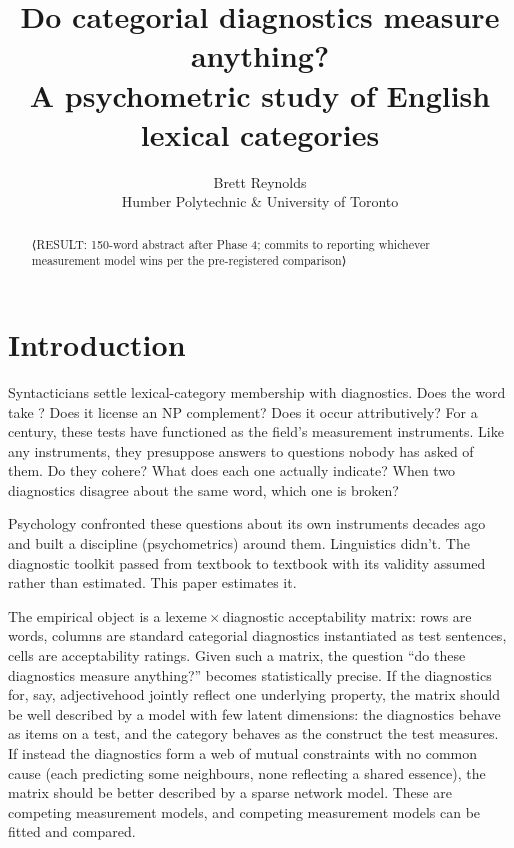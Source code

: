 \documentclass[12pt]{article}
\title{Do categorial diagnostics measure anything?\\
\large A psychometric study of English lexical categories}
\author{Brett Reynolds\\Humber Polytechnic \& University of Toronto}
\date{}
\begin{document}
\maketitle

\begin{abstract}
\noindent ⟨RESULT: 150-word abstract after Phase 4; commits to reporting
whichever measurement model wins per the pre-registered comparison⟩
\end{abstract}

\section{Introduction}\label{sec:intro}

Syntacticians settle lexical-category membership with diagnostics. Does the word
take ? Does it license an NP complement? Does it occur
attributively? For a century, these tests have functioned as the field's
measurement instruments. Like any instruments, they presuppose
answers to questions nobody has asked of them. Do they cohere? What does
each one actually indicate? When two diagnostics disagree about the same
word, which one is broken?

Psychology confronted these questions about its own instruments decades
ago and built a discipline (psychometrics) around them. Linguistics
didn't. The diagnostic toolkit passed from textbook to textbook with its
validity assumed rather than estimated. This paper estimates it.

The empirical object is a lexeme\,$\times$\,diagnostic acceptability
matrix: rows are words, columns are standard categorial diagnostics
instantiated as test sentences, cells are acceptability ratings. Given
such a matrix, the question \enquote{do these diagnostics measure
anything?} becomes statistically precise. If the diagnostics for, say,
adjectivehood jointly reflect one underlying property, the matrix should
be well described by a model with few latent dimensions: the diagnostics
behave as items on a test, and the category behaves as the construct the
test measures. If instead the diagnostics form a web of mutual
constraints with no common cause (each predicting some neighbours,
none reflecting a shared essence), the matrix should be better described
by a sparse network model. These are competing measurement models, and
competing measurement models can be fitted and compared.
\end{document}
